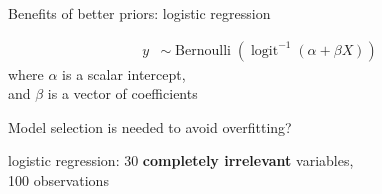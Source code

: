 \documentclass[english,t]{beamer}
\DeclareMathOperator{\Bernoulli}{Bernoulli}
\DeclareMathOperator{\logit}{logit}
\begin{document}
\begin{frame}{Benefits of better priors: logistic regression}

  \begin{align*}
    y & \sim  \Bernoulli\left( \logit^{-1}(\alpha + \beta X )\right)
  \end{align*}
  where $\alpha$ is a scalar intercept,\\ and $\beta$ is a vector of
  coefficients
  
\end{frame}
\begin{frame}{Model selection is needed to avoid overfitting?}

  logistic regression: 30 \textbf{completely irrelevant} variables, \\100
  observations
  

\end{frame}
\end{document}
